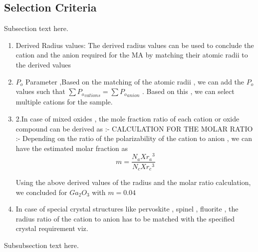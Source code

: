 \documentclass[journal]{IEEEtran}
\begin{document}
\begin{multicols}{2}
\subsection{Selection Criteria}
Subsection text here.
\begin{enumerate}
	\item{Derived Radius values: The derived radius values can be used to conclude the cation and the anion required for the MA by matching their atomic radii to the derived values}
	\item {$P_o $ Parameter ,Based on the matching of the atomic radii , we can add the $P_o$ values such that $\sum {P_o}_{cations} = \sum {P_o}_{anion}$ }. Based on this , we can select multiple cations for the sample.
	\item{2.In case of mixed oxides , the mole fraction ratio of each cation or oxide compound can be derived as :-
		CALCULATION FOR THE MOLAR RATIO :-
		Depending on the ratio of the polarizability of the cation to anion , we can have the estimated molar fraction as
		\begin{equation}
		m = \frac{N_a X {r_a}^3}{N_c X {r_c}^3}
		\end{equation}
		
		Using the above derived values of the radius and the molar ratio calculation, we concluded for $Ga_2 O_3$
		with $m = 0.04$ }
	\item{In case of special crystal structures like pervoskite , spinel , fluorite , the radius ratio of the cation to anion has to be matched with the specified crystal requirement viz. }
\end{enumerate}



Subsubsection text here.


%
%


\end{multicols}
\end{document}
